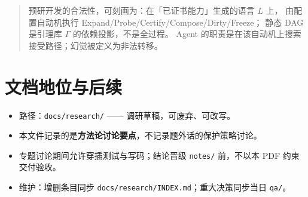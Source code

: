 \documentclass[UTF8,a4paper,11pt]{ctexart}
\begin{document}
\begin{quote}
预研开发的合法性，可刻画为：在「已证书能力」生成的语言 $L$ 上，
由配置自动机执行 \textsf{Expand}/\textsf{Probe}/\textsf{Certify}/\textsf{Compose}/\textsf{Dirty}/\textsf{Freeze}；
静态 DAG 是引理库 $\Gamma$ 的依赖投影，不是全过程。
Agent 的职责是在该自动机上搜索接受路径；幻觉被定义为非法转移。
\end{quote}

\section{文档地位与后续}

\begin{itemize}
  \item 路径：\texttt{docs/research/} —— 调研草稿，可废弃、可改写。
  \item 本文件记录的是\textbf{方法论讨论要点}，不记录题外话的保护策略讨论。
  \item 专题讨论期间允许穿插测试与写码；结论晋级 \texttt{notes/} 前，不以本 PDF 约束交付验收。
  \item 维护：增删条目同步 \texttt{docs/research/INDEX.md}；重大决策同步当日 \texttt{qa/}。
\end{itemize}
\end{document}
